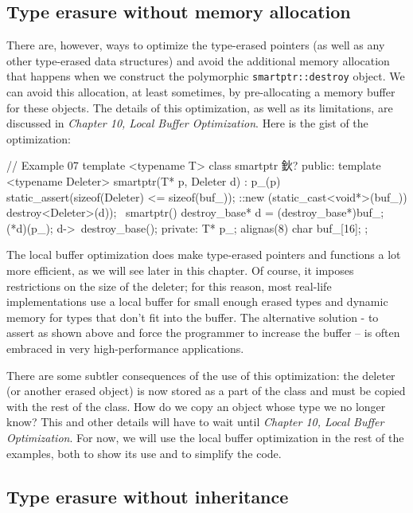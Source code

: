 \subsection{Type erasure without memory allocation}

There are, however, ways to optimize the type-erased pointers (as well as any other type-erased data structures) and avoid the additional memory allocation that happens when we construct the polymorphic \texttt{smartptr::destroy} object. We can avoid this allocation, at least sometimes, by pre-allocating a memory buffer for these objects. The details of this optimization, as well as its limitations, are discussed in \emph{Chapter 10, Local Buffer Optimization}. Here is the gist of the optimization:

\begin{code}
// Example 07
template <typename T> class smartptr {
  鈥?
  public:
  template <typename Deleter> smartptr(T* p, Deleter d) :
    p_(p) {
    static_assert(sizeof(Deleter) <= sizeof(buf_));
    ::new (static_cast<void*>(buf_)) destroy<Deleter>(d));
  }
  ~smartptr() {
    destroy_base* d = (destroy_base*)buf_;
    (*d)(p_);
    d->~destroy_base();
  }
  private:
  T* p_;
  alignas(8) char buf_[16];
};
\end{code}

The local buffer optimization does make type-erased pointers and functions a lot more efficient, as we will see later in this chapter. Of course, it imposes restrictions on the size of the deleter; for this reason, most real-life implementations use a local buffer for small enough erased types and dynamic memory for types that don't fit into the buffer. The alternative solution - to assert as shown above and force the programmer to increase the buffer -- is often embraced in very high-performance applications.

There are some subtler consequences of the use of this optimization: the deleter (or another erased object) is now stored as a part of the class and must be copied with the rest of the class. How do we copy an object whose type we no longer know? This and other details will have to wait until \emph{Chapter 10, Local Buffer Optimization}. For now, we will use the local buffer optimization in the rest of the examples, both to show its use and to simplify the code.

\subsection{Type erasure without inheritance}

